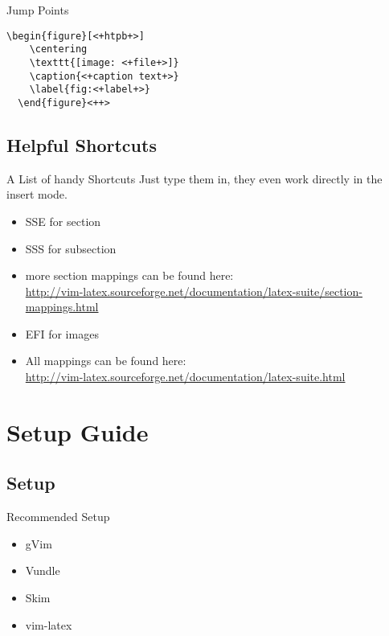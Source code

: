 \documentclass[aspectratio=169]{beamer}
\begin{document}
\begin{frame}[fragile]{Jump Points}
  \begin{lstlisting}[caption = Jump Points]
  \begin{figure}[<+htpb+>]
    \centering
    \texttt{[image: <+file+>]}
    \caption{<+caption text+>}
    \label{fig:<+label+>}
  \end{figure}<++>
  \end{lstlisting}
\end{frame}

\subsection{Helpful Shortcuts}
\begin{frame}{A List of handy Shortcuts}
  Just type them in, they even work directly in the insert mode.
  \vspace{0.2cm}
  \begin{itemize}
    \item SSE for section
    \item SSS for subsection
    \item more section mappings can be found here: \\ \url{http://vim-latex.sourceforge.net/documentation/latex-suite/section-mappings.html}
    \item EFI for images
    \item All mappings can be found here: \\ \url{http://vim-latex.sourceforge.net/documentation/latex-suite.html}
  \end{itemize}
\end{frame}
\section{Setup Guide}
\subsection{Setup}
\begin{frame}{Recommended Setup}
  \begin{itemize}
    \item gVim
    \item Vundle
    \item Skim
    \item vim-latex
  \end{itemize}
\end{frame}
\end{document}
